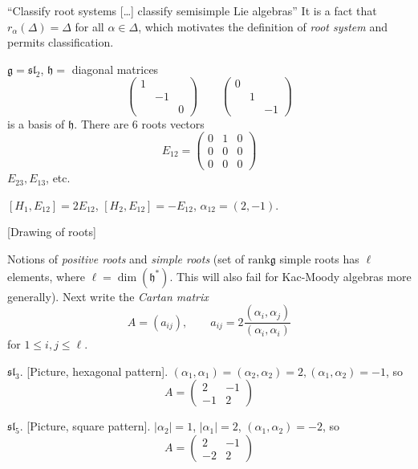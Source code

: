``Classify root systems […] classify
semisimple Lie algebras''
It is a fact that $r_\alpha (\Delta)=\Delta$
for all $\alpha \in \Delta$,
which motivates the definition of {\it root
system}
and permits classification.

\begin{example}
\label{example-root-system-sl2}
$\mathfrak{g}=\mathfrak{sl}_2$,
$\mathfrak{h}=$ diagonal matrices
$$
\begin{pmatrix}
1&&\\
&-1&\\
& & 0
\end{pmatrix}
\qquad
\begin{pmatrix}
0&&\\
&1&\\
& & -1
\end{pmatrix}
$$
is a basis of $\mathfrak{h}$. There are 6
roots vectors
$$
E_{12}=
\begin{pmatrix}
0 & 1 & 0\\
0 & 0 & 0\\
0 & 0 & 0
\end{pmatrix}
$$
$E_{23},E_{13}$, etc.
\end{example}

\begin{exercise}
\label{exercise-basis-of-h}
$[H_1,E_{12}]=2E_{12}$,
$[H_2,E_{12}]=-E_{12}$, $\alpha_{12}=(2,-1)$.
\end{exercise}

[Drawing of roots]

Notions of {\it positive roots} and {\it
simple roots}
(set of $\text{rank}\mathfrak{g}$ simple
roots has $\ell$ elements,
 where $\ell=\dim(\mathfrak{h}^*)$.
This will also fail for Kac-Moody algebras
more generally).
Next write the {\it Cartan matrix}
$$
A=(a_{ij}),\qquad
a_{ij}=2\frac{(\alpha_i,\alpha_j)}{(\alpha_i,
\alpha_i)}
$$
for $1\leq i,j \leq \ell$.

\begin{example}
\label{example-Cartan-matrix-sl3}
$\mathfrak{sl}_3$. [Picture, hexagonal
pattern].
$(\alpha_1,\alpha_1)=(\alpha_2,\alpha_2)=2,
(\alpha_1,\alpha_2)=-1$,
so
$$
A=\begin{pmatrix}
2&-1\\
-1&2
\end{pmatrix}
$$
\end{example}

\begin{example}
\label{example-Cartan-matrix-sl5}
$\mathfrak{sl}_5$. [Picture, square pattern].
$|\alpha_2|=1$, $|\alpha_1|=2$,
$(\alpha_1,\alpha_2)=-2$, so
$$
A=\begin{pmatrix}
2&-1\\
-2&2
\end{pmatrix}
$$
\end{example}

